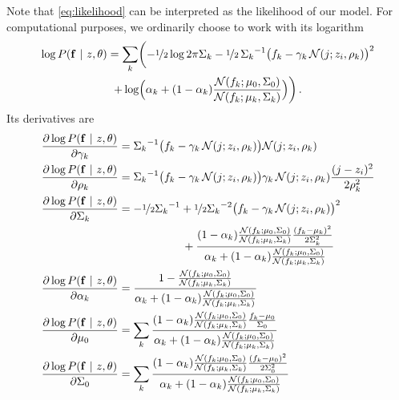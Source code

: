 \documentclass{article}
\begin{document}
Note that \eqref{eq:likelihood} can be interpreted as the likelihood of our model. For computational purposes, we ordinarily choose to work with its logarithm
\begin{multline}\label{eq:loglikelihood}
 \log P(\mathbf{f} ~|~ z, \theta) = \sum_k \biggl(
    -\nicefrac{1}{2}\log 2 \pi \Sigma_k 
    -\nicefrac{1}{2}\,{\Sigma_k}^{-1}\bigl(f_k - \gamma_k\, \mathcal{N}(j; z_i, \rho_k)\bigr)^2\\
    +\log \Bigl(\alpha_k + (1-\alpha_k) \frac{\mathcal{N}(f_k; \mu_0, \Sigma_0)}{\mathcal{N}(f_k; \mu_k, \Sigma_k)}\Bigr)
\biggr)\,.
\end{multline}
Its derivatives are
\begin{align}\label{eq:grad_loglikelihood}
\frac{\partial \log P(\mathbf{f} ~|~ z, \theta)}{\partial  \gamma_k}
    & =
    {\Sigma_k}^{-1}\bigl(f_k - \gamma_k\, \mathcal{N}(j; z_i, \rho_k)\bigr) \mathcal{N}(j; z_i, \rho_k)\\
\frac{\partial \log P(\mathbf{f} ~|~ z, \theta)}{\partial  \rho_k}
    & =
    {\Sigma_k}^{-1}\bigl(f_k - \gamma_k\, \mathcal{N}(j; z_i, \rho_k)\bigr) \gamma_k\,\mathcal{N}(j; z_i, \rho_k)\frac{(j-z_i)^2}{2 \rho_k^2}\\
\frac{\partial \log P(\mathbf{f} ~|~ z, \theta)}{\partial  \Sigma_k}
    & =
    -\nicefrac{1}{2}{\Sigma_k}^{-1}
    +\nicefrac{1}{2}{\Sigma_k}^{-2}\bigl(f_k - \gamma_k\, \mathcal{N}(j; z_i, \rho_k)\bigr)^2\\
    & \hspace{2cm} +\frac{ (1-\alpha_k) \frac{\mathcal{N}(f_k; \mu_0, \Sigma_0)}{\mathcal{N}(f_k; \mu_k, \Sigma_k)}\frac{(f_k-\mu_k)^2}{2 \Sigma_k^2}}
    {\alpha_k + (1-\alpha_k) \frac{\mathcal{N}(f_k; \mu_0, \Sigma_0)}{\mathcal{N}(f_k; \mu_k, \Sigma_k)}}\\
\frac{\partial \log P(\mathbf{f} ~|~ z, \theta)}{\partial  \alpha_k}
    & =
    \frac{ 1-\frac{\mathcal{N}(f_k; \mu_0, \Sigma_0)}{\mathcal{N}(f_k; \mu_k, \Sigma_k)}}
    {\alpha_k + (1-\alpha_k) \frac{\mathcal{N}(f_k; \mu_0, \Sigma_0)}{\mathcal{N}(f_k; \mu_k, \Sigma_k)}}\\
\frac{\partial \log P(\mathbf{f} ~|~ z, \theta)}{\partial  \mu_0}
    & = \sum_k
    \frac{ (1-\alpha_k)\frac{\mathcal{N}(f_k; \mu_0, \Sigma_0)}{\mathcal{N}(f_k; \mu_k, \Sigma_k)}\frac{f_k-\mu_0}{\Sigma_0}}
    {\alpha_k + (1-\alpha_k) \frac{\mathcal{N}(f_k; \mu_0, \Sigma_0)}{\mathcal{N}(f_k; \mu_k, \Sigma_k)}}
    \\
\frac{\partial \log P(\mathbf{f} ~|~ z, \theta)}{\partial  \Sigma_0}
    & = \sum_k
    \frac{ (1-\alpha_k)\frac{\mathcal{N}(f_k; \mu_0, \Sigma_0)}{\mathcal{N}(f_k; \mu_k, \Sigma_k)}\frac{(f_k-\mu_0)^2}{2 \Sigma_0^2}}
    {\alpha_k + (1-\alpha_k) \frac{\mathcal{N}(f_k; \mu_0, \Sigma_0)}{\mathcal{N}(f_k; \mu_k, \Sigma_k)}}
\end{align}
\end{document}
